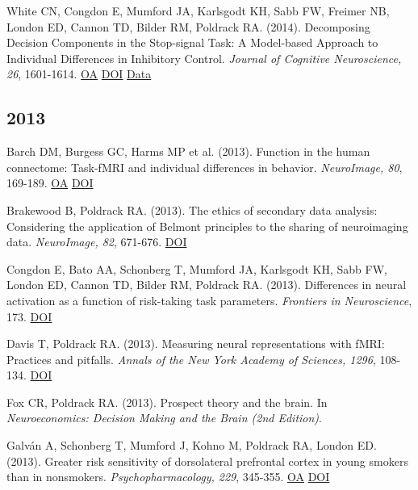 \documentclass[10pt, letterpaper]{article}
\begin{document}
White CN, Congdon E, Mumford JA, Karlsgodt KH, Sabb FW, Freimer NB, London ED, Cannon TD, Bilder RM, Poldrack RA.  (2014). Decomposing Decision Components in the Stop-signal Task: A Model-based Approach to Individual Differences in Inhibitory Control. \textit{Journal of Cognitive Neuroscience, 26}, 1601-1614. \href{https://www.ncbi.nlm.nih.gov/pmc/articles/PMC4119005}{OA} \href{https://doi.org/10.1162/jocn_a_00567}{DOI} \href{https://openneuro.org/datasets/ds000030/versions/1.0.0}{Data} \vspace{2mm}

\subsection*{2013}Barch DM, Burgess GC, Harms MP et al. (2013). Function in the human connectome: Task-fMRI and individual differences in behavior. \textit{NeuroImage, 80}, 169-189. \href{https://www.ncbi.nlm.nih.gov/pmc/articles/PMC4011498}{OA} \href{https://doi.org/10.1016/j.neuroimage.2013.05.033}{DOI} \vspace{2mm}

Brakewood B, Poldrack RA.  (2013). The ethics of secondary data analysis: Considering the application of Belmont principles to the sharing of neuroimaging data. \textit{NeuroImage, 82}, 671-676. \href{https://doi.org/10.1016/j.neuroimage.2013.02.040}{DOI} \vspace{2mm}

Congdon E, Bato AA, Schonberg T, Mumford JA, Karlsgodt KH, Sabb FW, London ED, Cannon TD, Bilder RM, Poldrack RA.  (2013). Differences in neural activation as a function of risk-taking task parameters. \textit{Frontiers in Neuroscience}, 173. \href{https://doi.org/10.3389/fnins.2013.00173}{DOI} \vspace{2mm}

Davis T, Poldrack RA.  (2013). Measuring neural representations with fMRI: Practices and pitfalls. \textit{Annals of the New York Academy of Sciences, 1296}, 108-134. \href{https://doi.org/10.1111/nyas.12156}{DOI} \vspace{2mm}

Fox CR, Poldrack RA.  (2013). Prospect theory and the brain. In \textit{Neuroeconomics: Decision Making and the Brain (2nd Edition)}. \vspace{2mm}

Galván A, Schonberg T, Mumford J, Kohno M, Poldrack RA, London ED.  (2013). Greater risk sensitivity of dorsolateral prefrontal cortex in young smokers than in nonsmokers. \textit{Psychopharmacology, 229}, 345-355. \href{https://www.ncbi.nlm.nih.gov/pmc/articles/PMC3758460}{OA} \href{https://doi.org/10.1007/s00213-013-3113-x}{DOI} \vspace{2mm}
\end{document}
